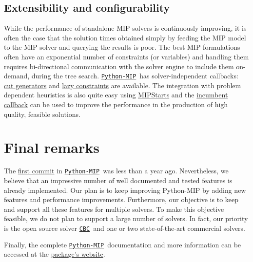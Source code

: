 \documentclass{article}
\def\CBC{\href{https://github.com/coin-or/cbc}{\texttt{CBC}}}
\def\PythonMIP{\href{https://github.com/coin-or/python-mip}{\texttt{Python-MIP}}}
\begin{document}
\subsection{Extensibility and configurability}

While the performance of standalone MIP solvers is continuously improving, it is often the case that the solution times obtained simply by feeding the MIP model to the MIP solver and querying the results is poor. 
The best MIP formulations often have an exponential number of constraints (or variables) and handling them requires bi-directional communication with the solver engine to include them on-demand, during the tree search. 
\PythonMIP\ has solver-independent callbacks: \href{https://python-mip.readthedocs.io/en/latest/custom.html#cut-callback}{cut generators} and \href{https://python-mip.readthedocs.io/en/latest/custom.html#lazy-constraints}{lazy constraints} are available. The integration with problem dependent heuristics is also quite easy using \href{https://python-mip.readthedocs.io/en/latest/custom.html#providing-initial-feasible-solutions}{MIPStarts} and the \href{https://python-mip.readthedocs.io/en/latest/classes.html#incumbentupdater}{incumbent callback} can be used to improve the performance in the production of high quality, feasible solutions.

\section{Final remarks}

The \href{https://github.com/coin-or/python-mip/commit/ba1719db4bf033dd661844bc797779a98a884d81}{first commit} in \PythonMIP\ was less than a year ago. 
Nevertheless, we believe that an impressive number of well documented and tested features is already implemented. 
Our plan is to keep improving Python-MIP by adding new features and performance improvements. 
Furthermore, our objective is to keep and support all these features for multiple solvers. 
To make this objective feasible, we do not plan to support a large number of solvers.
In fact, our priority is the open source solver \CBC\ and one or two state-of-the-art commercial solvers. 

Finally, the complete \PythonMIP\ documentation and more information can be accessed at the \href{http://www.python-mip.com}{package's website}.



\end{document}
